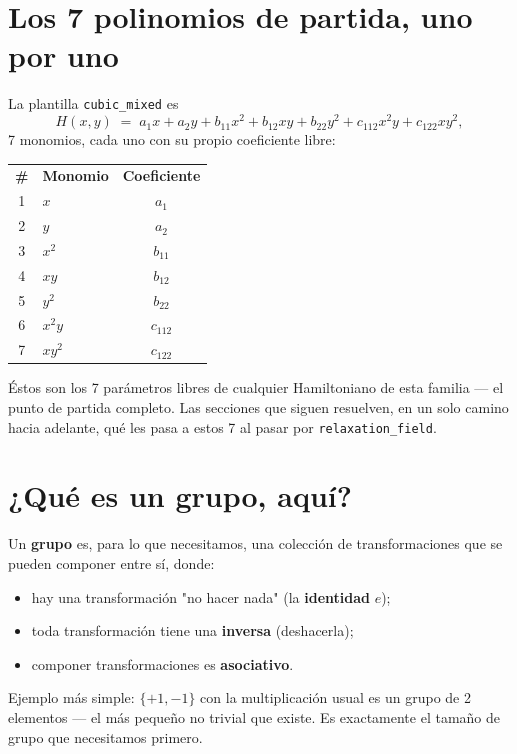 \documentclass[11pt, a4paper]{article}
\newcommand{\TH}[1]{\cellcolor{cTHbg}\color{white}\textbf{#1}}
\begin{document}
\section{Los 7 polinomios de partida, uno por uno}
\label{sec:los7}

La plantilla \texttt{cubic\_mixed} es
\[
H(x,y) \;=\; a_1x + a_2y + b_{11}x^2 + b_{12}xy + b_{22}y^2
+ c_{112}x^2y + c_{122}xy^2,
\]
7 monomios, cada uno con su propio coeficiente libre:

\medskip
\begin{center}
\begin{tabular}{clc}
  \TH{\#} & \TH{Monomio} & \TH{Coeficiente} \\[1pt]
  1 & $x$     & $a_1$ \\
  2 & $y$     & $a_2$ \\
  3 & $x^2$   & $b_{11}$ \\
  4 & $xy$    & $b_{12}$ \\
  5 & $y^2$   & $b_{22}$ \\
  6 & $x^2y$  & $c_{112}$ \\
  7 & $xy^2$  & $c_{122}$ \\
\end{tabular}
\end{center}
\medskip

\'Estos son los 7 par\'ametros libres de cualquier Hamiltoniano de
esta familia --- el punto de partida completo. Las secciones que
siguen resuelven, en un solo camino hacia adelante, qu\'e les pasa a
estos 7 al pasar por \texttt{relaxation\_field}.

\section{¿Qu\'e es un grupo, aqu\'i?}

Un \textbf{grupo} es, para lo que necesitamos, una colecci\'on de
transformaciones que se pueden componer entre s\'i, donde:
\begin{itemize}
  \item hay una transformaci\'on "no hacer nada" (la \textbf{identidad} $e$);
  \item toda transformaci\'on tiene una \textbf{inversa} (deshacerla);
  \item componer transformaciones es \textbf{asociativo}.
\end{itemize}

Ejemplo m\'as simple: $\{+1,-1\}$ con la multiplicaci\'on usual es un
grupo de 2 elementos --- el m\'as peque\~no no trivial que existe. Es
exactamente el tama\~no de grupo que necesitamos primero.
\end{document}
